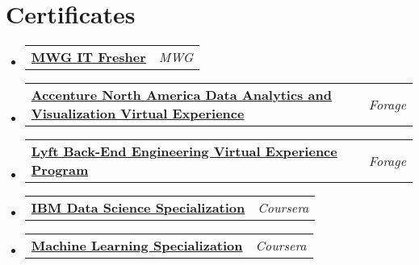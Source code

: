 \documentclass[letterpaper,11pt]{article}
\makeatletter
\newcommand{\resumeOrganizationHeading}[2]{
  \vspace{-2pt}\item
    \begin{tabular*}{0.97\textwidth}[t]{l@{\extracolsep{\fill}}r}
      \textbf{#1} & \textit{\small #2} \\
    \end{tabular*}\vspace{-7pt}
}
\newcommand{\resumeSubHeadingListStart}{\begin{itemize}[leftmargin=0.15in, label={}]}
\newcommand{\resumeSubHeadingListEnd}{\end{itemize}}
\makeatother
\begin{document}
        
        
        



\section{Certificates}
  \resumeSubHeadingListStart
    
    \resumeOrganizationHeading
      {\href{https://drive.google.com/file/d/1byFfX2mUtbEEEcJt48gu4S_juwKK0t5B/view?usp=sharing}{MWG IT Fresher}}{MWG}

      \resumeOrganizationHeading
      {\href{http://tinyurl.com/yhaa673m}{Accenture North America Data Analytics and Visualization Virtual Experience}}{Forage}

      \resumeOrganizationHeading
      {\href{http://tinyurl.com/dbd8tdnj}{Lyft Back-End Engineering Virtual Experience Program}}{Forage}

      \resumeOrganizationHeading
      {\href{https://www.coursera.org/account/accomplishments/specialization/certificate/44U9NEJHAVHD}{IBM Data Science Specialization}}{Coursera}
      
      \resumeOrganizationHeading
      {\href{https://www.coursera.org/account/accomplishments/specialization/certificate/4ECUSVEVGYJ3}{Machine Learning Specialization}}{Coursera}
    
  \resumeSubHeadingListEnd


\end{document}
